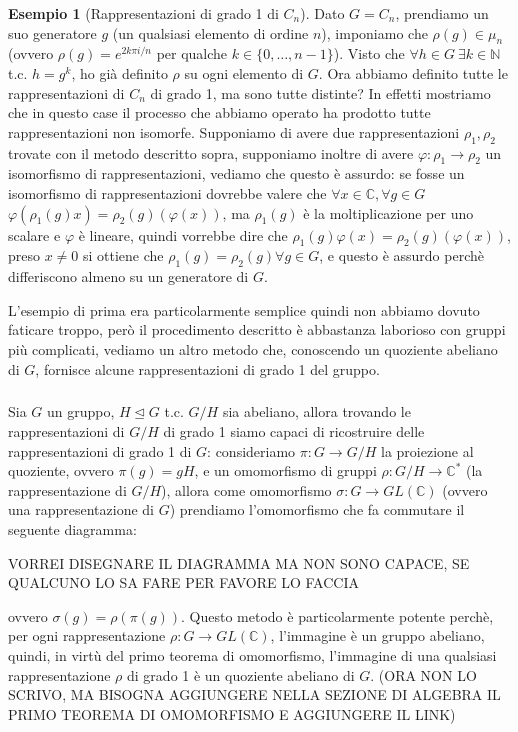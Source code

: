 \documentclass[11pt]{article}
\theoremstyle{plain}
\theoremstyle{definition}
\newtheorem{exmp}{Esempio}[section]
\theoremstyle{remark}
\newcommand{\C}{\mathbb{C}}
\newcommand{\N}{\mathbb{N}}
\begin{document}
\begin{exmp}[Rappresentazioni di grado 1 di $C_n$]
Dato $G=C_n$, prendiamo un suo generatore $g$ (un qualsiasi elemento di ordine $n$), imponiamo che $\rho(g)\in \mu_n$ (ovvero $\rho(g)=e^{2k\pi i/n}$ per qualche $k\in \{0,\ldots,n-1\}$). Visto che $\forall h\in G\ \exists k\in \N$ t.c. $h=g^k$, ho già definito $\rho$ su ogni elemento di $G$.\newline
Ora abbiamo definito tutte le rappresentazioni di $C_n$ di grado 1, ma sono tutte distinte? In effetti mostriamo che in questo case il processo che abbiamo operato ha prodotto tutte rappresentazioni non isomorfe. Supponiamo di avere due rappresentazioni $\rho_1, \rho_2$ trovate con il metodo descritto sopra, supponiamo inoltre di avere $\varphi:\rho_1\to\rho_2$ un isomorfismo di rappresentazioni, vediamo che questo è assurdo: se fosse un isomorfismo di rappresentazioni dovrebbe valere che $\forall x\in \C, \forall g\in G$ $\varphi( \rho_1(g)x ) = \rho_2(g)( \varphi(x) )$, ma $\rho_1(g)$ è la moltiplicazione per uno scalare e $\varphi$ è lineare, quindi vorrebbe dire che $\rho_1(g)\varphi( x ) = \rho_2(g)( \varphi(x) )$, preso $x\neq 0$ si ottiene che $\rho_1(g)=\rho_2(g)\forall g\in G$, e questo è assurdo perchè differiscono almeno su un generatore di $G$.
\end{exmp}

L'esempio di prima era particolarmente semplice quindi non abbiamo dovuto faticare troppo, però il procedimento descritto è abbastanza laborioso con gruppi più complicati, vediamo un altro metodo che, conoscendo un quoziente abeliano di $G$, fornisce alcune rappresentazioni di grado 1 del gruppo.
\subparagraph{}
Sia $G$ un gruppo, $H\trianglelefteq G$ t.c. $G/H$ sia abeliano, allora trovando le rappresentazioni di $G/H$ di grado 1 siamo capaci di ricostruire delle rappresentazioni di grado 1 di $G$: consideriamo $\pi:G\to G/H$ la proiezione al quoziente, ovvero $\pi(g)=gH$, e un omomorfismo di gruppi $\rho:G/H\to \C^*$ (la rappresentazione di $G/H$), allora come omomorfismo $\sigma:G\to GL(\C)$ (ovvero una rappresentazione di $G$) prendiamo l'omomorfismo che fa commutare il seguente diagramma:


VORREI DISEGNARE IL DIAGRAMMA MA NON SONO CAPACE, SE QUALCUNO LO SA FARE PER FAVORE LO FACCIA


ovvero $\sigma(g)=\rho(\pi(g))$.\newline
Questo metodo è particolarmente potente perchè, per ogni rappresentazione $\rho:G\to GL(\C)$, l'immagine è un gruppo abeliano, quindi, in virtù del primo teorema di omomorfismo, l'immagine di una qualsiasi rappresentazione $\rho$ di grado 1 è un quoziente abeliano di $G$.
(ORA NON LO SCRIVO, MA BISOGNA AGGIUNGERE NELLA SEZIONE DI ALGEBRA IL PRIMO TEOREMA DI OMOMORFISMO E AGGIUNGERE IL LINK)
\end{document}
